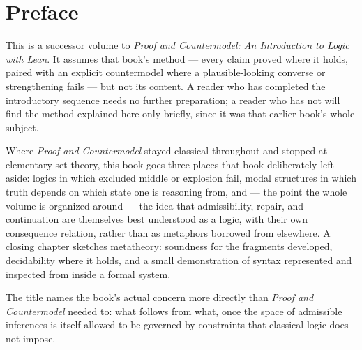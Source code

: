 \chapter*{Preface}

This is a successor volume to \textit{Proof and Countermodel: An
Introduction to Logic with Lean}. It assumes that book's method —
every claim proved where it holds, paired with an explicit
countermodel where a plausible-looking converse or strengthening
fails — but not its content. A reader who has completed the
introductory sequence needs no further preparation; a reader who
has not will find the method explained here only briefly, since it
was that earlier book's whole subject.

Where \textit{Proof and Countermodel} stayed classical throughout
and stopped at elementary set theory, this book goes three places
that book deliberately left aside: logics in which excluded middle
or explosion fail, modal structures in which truth depends on which
state one is reasoning from, and — the point the whole volume is
organized around — the idea that admissibility, repair, and
continuation are themselves best understood as a logic, with their
own consequence relation, rather than as metaphors borrowed from
elsewhere. A closing chapter sketches metatheory: soundness for the
fragments developed, decidability where it holds, and a small
demonstration of syntax represented and inspected from inside a
formal system.

The title names the book's actual concern more directly than
\textit{Proof and Countermodel} needed to: what follows from what,
once the space of admissible inferences is itself allowed to be
governed by constraints that classical logic does not impose.
